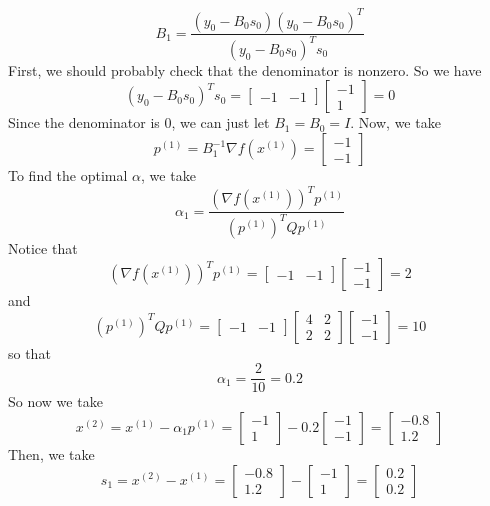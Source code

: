 \documentclass[12pt]{article}
\begin{document}
\[
B_{1} = \frac{(y_0 - B_0 s_0)(y_0 - B_0 s_0)^T}{(y_0 - B_0 s_0)^Ts_0}
\] First, we should probably check that the denominator is nonzero. So we have
\[
(y_0 - B_0 s_0)^T s_0 = 
\begin{bmatrix}
-1 & - 1
\end{bmatrix}
\begin{bmatrix}
-1\\
1
\end{bmatrix} = 0
\] Since the denominator is $0$, we can just let $B_1 = B_0 = I$.
Now, we take
\[
p^{(1)} = B_1^{-1} \nabla f(x^{(1)}) = 
\begin{bmatrix}
-1\\
-1
\end{bmatrix}
\] To find the optimal $\alpha$, we take
\[
\alpha_1 = \frac{(\nabla f(x^{(1)}))^T p^{(1)}  }{(p^{(1)})^TQ p^{(1)} }
\] Notice that
\[
(\nabla f(x^{(1)}))^T p^{(1)} =   \begin{bmatrix}
-1 & -1
\end{bmatrix}  \begin{bmatrix}
-1 \\ -1
\end{bmatrix} = 2 
\] and
\[
(p^{(1)})^TQ p^{(1)} = 
\begin{bmatrix}
-1 & -1
\end{bmatrix} \begin{bmatrix}
4 & 2\\
2 & 2
\end{bmatrix}  \begin{bmatrix}
-1 \\ -1
\end{bmatrix} = 10
\] so that
\[
\alpha_1 = \frac{2}{10} = 0.2
\] So now we take
\[
x^{(2)} = x^{(1)} - \alpha_1 p^{(1)} = \begin{bmatrix}
-1\\
1
\end{bmatrix} - 0.2 \begin{bmatrix}
-1\\
-1
\end{bmatrix} = 
\begin{bmatrix}
-0.8\\
1.2
\end{bmatrix}
\] Then, we take
\[
s_1 = x^{(2)} - x^{(1)} = \begin{bmatrix}
-0.8\\
1.2
\end{bmatrix} -  \begin{bmatrix}
-1\\
1
\end{bmatrix} =
\begin{bmatrix}
0.2\\
0.2
\end{bmatrix}
\]
\end{document}
